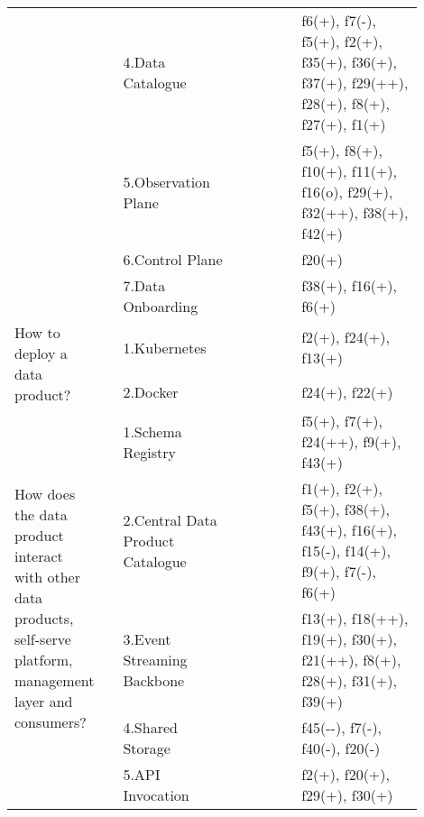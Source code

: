 \begin{tabular}{|p{0.12\linewidth}|p{0.015\linewidth}|p{0.3\linewidth}|p{0.15\linewidth}|p{0.31\linewidth}|}
 & \cellcolor{emerald_shape_6}{} & 4.Data Catalogue&\cellcolor{emerald_shape_5}{s1, s3, s5, s7, s9, s15, s16, s25, s30, s31, s32, s37, s43, s47, s48, s53, s55} & f6(+), f7(-), f5(+), f2(+), f35(+), f36(+), f37(+), f29(++), f28(+), f8(+), f27(+), f1(+)\\
 & \cellcolor{emerald_shape_6}{} & 5.Observation Plane&\cellcolor{emerald_shape_3}{s3, s7, s11, s13, s22, s52} & f5(+), f8(+), f10(+), f11(+), f16(o), f29(+), f32(++), f38(+), f42(+)\\
 & \cellcolor{emerald_shape_6}{} & 6.Control Plane&\cellcolor{emerald_shape_2}{s49, s52} & f20(+)\\
 & \multirow{-7}{\linewidth}{ \cellcolor{emerald_shape_6}{37}} &7.Data Onboarding&\cellcolor{emerald_shape_3}{s4, s5, s15, s30, s52} & f38(+), f16(+), f6(+)\\
\multirow{2}{\linewidth}{How to deploy a data product?} &\cellcolor{emerald_shape_3}{} &1.Kubernetes&\cellcolor{emerald_shape_7}{s6, s14, s32, s35, s39, s43, s45, s47} & f2(+), f24(+), f13(+)\\
 & \multirow{-2}{\linewidth}{ \cellcolor{emerald_shape_3}{11}} &2.Docker&\cellcolor{emerald_shape_6}{s14, s15, s30, s32, s33, s45, s47} & f24(+), f22(+)\\
\multirow{7}{\linewidth}{How does the data product interact with other data products, self-serve platform, management layer and consumers?} &\cellcolor{emerald_shape_7}{} &1.Schema Registry&\cellcolor{emerald_shape_4}{s3, s6, s7, s15, s16, s17, s19, s20, s24, s41, s47, s48, s54, s57} & f5(+), f7(+), f24(++), f9(+), f43(+)\\
 & \cellcolor{emerald_shape_7}{} & 2.Central Data Product Catalogue&\cellcolor{emerald_shape_5}{s5, s9, s15, s20, s23, s31, s32, s39, s40, s42, s45, s46, s47, s48, s49, s53, s54, s55} & f1(+), f2(+), f5(+), f38(+), f43(+), f16(+), f15(-), f14(+), f9(+), f7(-), f6(+)\\
 & \cellcolor{emerald_shape_7}{} & 3.Event Streaming Backbone&\cellcolor{emerald_shape_5}{s4, s9, s17, s20, s26, s33, s34, s36, s38, s41, s44, s45, s48, s51, s52, s53, s55, s56, s57} & f13(+), f18(++), f19(+), f30(+), f21(++), f8(+), f28(+), f31(+), f39(+)\\
 & \cellcolor{emerald_shape_7}{} & 4.Shared Storage&\cellcolor{emerald_shape_1}{s33} & f45(-{}-), f7(-), f40(-), f20(-)\\
 & \cellcolor{emerald_shape_7}{} & 5.API Invocation&\cellcolor{emerald_shape_6}{s2, s3, s5, s6, s7, s8, s9, s15, s17, s18, s19, s20, s30, s32, s33, s34, s36, s37, s38, s39, s40, s41, s45, s49, s52} & f2(+), f20(+), f29(+), f30(+)\\

\end{tabular}
